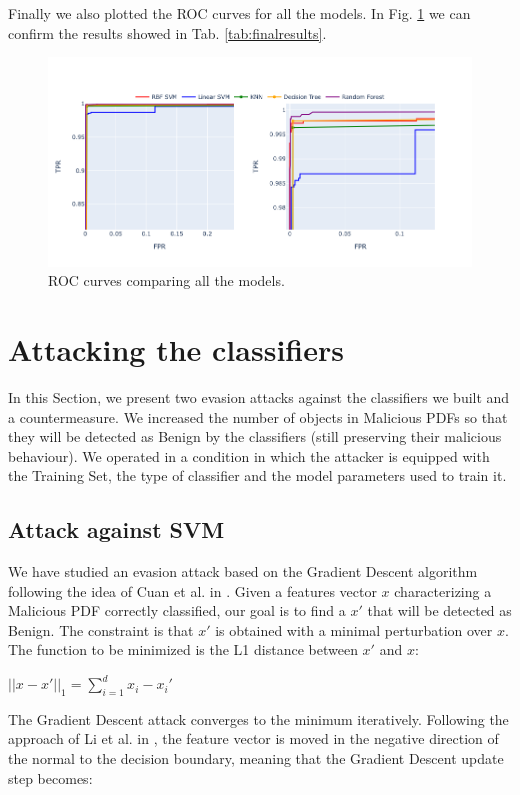 \documentclass[twocolumn, switch]{article} %
\newcommand\x{0.7}
\begin{document}
Finally we also plotted the ROC curves for all the models. In Fig. \ref{fig:roc} we can  confirm the results showed in Tab. \ref{tab:finalresults}.
\begin{figure}[ht!]
	\centering
	\includegraphics[width=\x\linewidth]{roc.png}
	\caption{ROC curves comparing all the models. }
	\label{fig:roc}
\end{figure}

\section{Attacking the classifiers}
\label{sec:attacks}
In this Section, we present two evasion attacks against the classifiers we built and a countermeasure. We increased the number of objects in Malicious PDFs so that they will be detected as Benign by the classifiers (still preserving their malicious behaviour). We operated in a condition in which the attacker is equipped with the Training Set, the type of classifier and the model parameters used to train it.
\subsection{Attack against SVM}
\label{subsec:svm}
We have studied an evasion attack based on the Gradient Descent algorithm following the idea of Cuan et al. in \cite{cuan_damien_delaplace_valois_2018}. Given
a features vector $x$ characterizing a Malicious PDF correctly classified, our goal is to find a $x'$ that will be detected as Benign. The constraint is that $x'$ is obtained with a minimal perturbation over $x$. The function to be minimized is the L1 distance between $x'$ and $x$:
\begin{center}
	$||x-x'||_1 = \sum_{i=1}^{d}x_i-x_i'$
\end{center}

The Gradient Descent attack converges to the minimum iteratively. Following the approach of Li et al. in \cite{li_liu_yan_yang_2022}, the feature vector is moved in the negative direction of the normal to the decision boundary, meaning that the Gradient Descent update step becomes:
\end{document}
